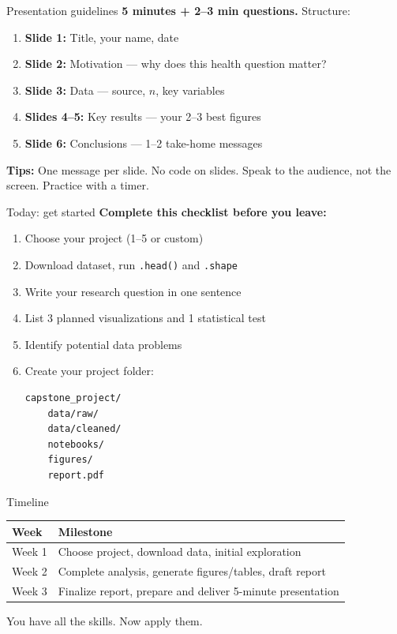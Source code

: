 \documentclass[aspectratio=169,11pt]{beamer}
\begin{document}
\begin{frame}{Presentation guidelines}
\textbf{5 minutes + 2--3 min questions.} Structure:
\begin{enumerate}
  \item \textbf{Slide 1:} Title, your name, date
  \item \textbf{Slide 2:} Motivation --- why does this health question matter?
  \item \textbf{Slide 3:} Data --- source, $n$, key variables
  \item \textbf{Slides 4--5:} Key results --- your 2--3 best figures
  \item \textbf{Slide 6:} Conclusions --- 1--2 take-home messages
\end{enumerate}

\vspace{6pt}
\textbf{Tips:} One message per slide. No code on slides. Speak to the audience, not the screen. Practice with a timer.
\end{frame}

\begin{frame}[fragile]{Today: get started}
\textbf{Complete this checklist before you leave:}
\begin{enumerate}
  \item Choose your project (1--5 or custom)
  \item Download dataset, run \texttt{.head()} and \texttt{.shape}
  \item Write your research question in one sentence
  \item List 3 planned visualizations and 1 statistical test
  \item Identify potential data problems
  \item Create your project folder:
\begin{verbatim}
capstone_project/
    data/raw/
    data/cleaned/
    notebooks/
    figures/
    report.pdf
\end{verbatim}
\end{enumerate}
\end{frame}

\begin{frame}{Timeline}
\begin{table}
\begin{tabular}{lp{9cm}}
\toprule
\textbf{Week} & \textbf{Milestone} \\
\midrule
Week 1 & Choose project, download data, initial exploration \\
Week 2 & Complete analysis, generate figures/tables, draft report \\
Week 3 & Finalize report, prepare and deliver 5-minute presentation \\
\bottomrule
\end{tabular}
\end{table}

\vspace{12pt}
\centering
\Large {} \alert{You have all the skills. Now apply them.}
\end{frame}
\end{document}
